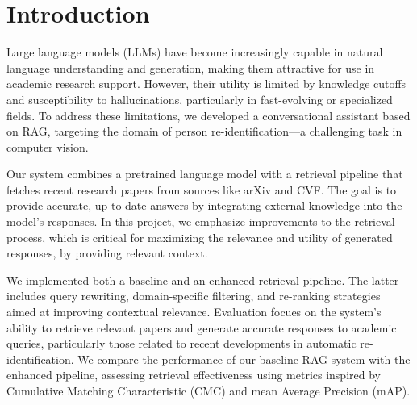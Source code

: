 \documentclass[fleqn,moreauthors,10pt]{ds_report}
\affiliation{\textit{Advisor: Aleš Žagar}}
\begin{document}
\flushbottom 

\maketitle 

\thispagestyle{empty} 


\section*{Introduction}
Large language models (LLMs) have become increasingly capable in natural language understanding and generation, making them attractive for use in academic research support. However, their utility is limited by knowledge cutoffs and susceptibility to hallucinations, particularly in fast-evolving or specialized fields. To address these limitations, we developed a conversational assistant based on RAG, targeting the domain of person re-identification—a challenging task in computer vision.

Our system combines a pretrained language model with a retrieval pipeline that fetches recent research papers from sources like arXiv and CVF. The goal is to provide accurate, up-to-date answers by integrating external knowledge into the model's responses. In this project, we emphasize improvements to the retrieval process, which is critical for maximizing the relevance and utility of generated responses, by providing relevant context.

We implemented both a baseline and an enhanced retrieval pipeline. The latter includes query rewriting, domain-specific filtering, and re-ranking strategies aimed at improving contextual relevance. Evaluation focues on the system's ability to retrieve relevant papers and generate accurate responses to academic queries, particularly those related to recent developments in automatic re-identification. We compare the performance of our baseline RAG system with the enhanced pipeline, assessing retrieval effectiveness using metrics inspired by Cumulative Matching Characteristic (CMC) and mean Average Precision (mAP).




\end{document}
